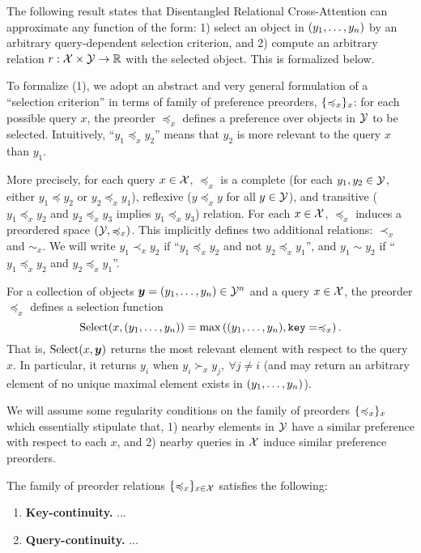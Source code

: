 \documentclass{article}
\begin{document}
The following result states that Disentangled Relational Cross-Attention can approximate any function of the form: 1) select an object in $(y_1, \ldots, y_n)$ by an arbitrary query-dependent selection criterion, and 2) compute an arbitrary relation $r: {\mathcal{X}} \times {\mathcal{Y}} \to \mathbb{R}$ with the selected object. This is formalized below.

To formalize (1), we adopt an abstract and very general formulation of a ``selection criterion'' in terms of family of preference preorders, $\{\preccurlyeq_x\}_x$: for each possible query $x$, the preorder $\preceq_x$ defines a preference over objects in ${\mathcal{Y}}$ to be selected. Intuitively, ``$y_1 \preceq_x y_2$'' means that $y_2$ is more relevant to the query $x$ than $y_1$.

More precisely, for each query $x \in {\mathcal{X}}$, $\preceq_x$ is a complete (for each $y_1, y_2 \in {\mathcal{Y}}$, either $y_1 \preceq y_2$ or $y_2 \preceq_x y_1$), reflexive ($y \preceq_x y$ for all $y \in {\mathcal{Y}}$), and transitive ($y_1 \preceq_x y_2$ and $y_2 \preceq_x y_3$ implies $y_1 \preceq_x y_3$) relation. For each $x \in {\mathcal{X}}$, $\preceq_x$ induces a preordered space $({\mathcal{Y}}, \preccurlyeq_x)$. This implicitly defines two additional relations: $\prec_x$ and $\sim_x$. We will write $y_1 \prec_x y_2$ if ``$y_1 \preceq_x y_2$ and not $y_2 \preceq_x y_1$'', and $y_1 \sim y_2$ if ``$y_1 \preceq_x y_2$ and $y_2 \preceq_x y_1$''.

For a collection of objects $\bm{y} = (y_1, \ldots, y_n) \in {\mathcal{Y}}^n$ and a query $x \in {\mathcal{X}}$, the preorder $\preceq_x$ defines a selection function
\begin{equation}\label{eq:def_selection}
  \mathrm{Select}(x, (y_1, \ldots, y_n)) = \max\left((y_1, \ldots, y_n), \mathtt{key}=\preccurlyeq_x\right).
\end{equation}
That is, $\mathrm{Select}(x, \bm{y})$ returns the most relevant element with respect to the query $x$. In particular, it returns $y_i$ when $y_i \succ_x y_j, \ \forall j \neq i$ (and may return an arbitrary element of no unique maximal element exists in $(y_1, \ldots, y_n)$).

We will assume some regularity conditions on the family of preorders $\{\preccurlyeq_x\}_x$ which essentially stipulate that, 1) nearby elements in ${\mathcal{Y}}$ have a similar preference with respect to each $x$, and 2) nearby queries in ${\mathcal{X}}$ induce similar preference preorders.

\begin{assumption}\label{ass:qk_cts}
  The family of preorder relations $\{\preccurlyeq_x\}_{x \in {\mathcal{X}}}$ satisfies the following:
  \begin{enumerate}
    \item \textbf{Key-continuity.} ...
    \item \textbf{Query-continuity.} ...
  \end{enumerate}
\end{assumption}
\end{document}
